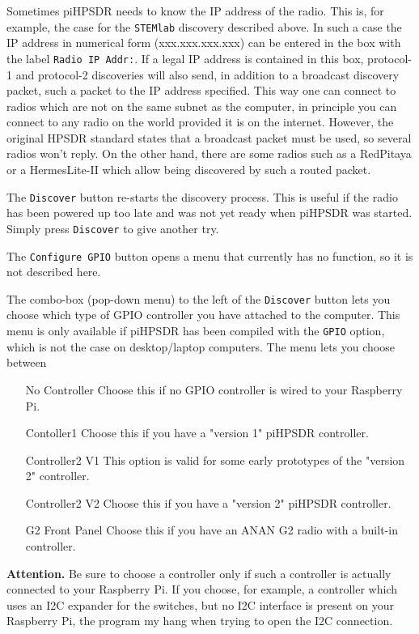 \documentclass[12pt]{book}
\begin{document}
Sometimes piHPSDR needs to know the IP address of the radio. This is, for example, the case for the \texttt{STEMlab} discovery
described above. In such a case the IP address in numerical form (xxx.xxx.xxx.xxx) can be entered in the box
with the label \texttt{Radio IP Addr:}. If a legal IP address is contained in this box, protocol-1 and protocol-2 discoveries
will also send, in addition to a broadcast discovery packet, such a packet to the IP address specified. This way one can
connect to radios which are not on the same subnet as the computer, in principle you can connect to any radio on the world
provided it is on the internet. However, the original HPSDR standard states that a broadcast packet must be used, so several
radios won't reply. On the other hand, there are some radios such as a RedPitaya or a HermesLite-II which allow being discovered
by such a routed packet. 

The \texttt{Discover} button re-starts the discovery process. This is useful if the radio has been powered up too late and
was not yet ready when piHPSDR was started. Simply press \texttt{Discover} to give another try.

The \texttt{Configure GPIO} button opens a menu that currently has no function, so it is not described here.

The combo-box (pop-down menu) to the left of the \texttt{Discover} button lets you choose which type of GPIO controller you
have attached to the computer. This menu is only available if piHPSDR has been compiled with the \texttt{GPIO} option, which
is not the case on desktop/laptop computers. The menu lets you choose between

\begin{itemize}[font=\texttt, left=80pt]
\item[No Controller]{Choose this if no GPIO controller is wired to your Raspberry Pi.}
\item[Contoller1]{Choose this if you have a "version 1" piHPSDR controller.}
\item[Controller2 V1]{This option is valid for some early prototypes of the "version 2" controller.}
\item[Controller2 V2]{Choose this if you have a "version 2" piHPSDR controller.}
\item[G2 Front Panel]{Choose this if you have an ANAN G2 radio with a built-in controller.}
\end{itemize}

\textbf{Attention.} Be sure to choose a controller only if such a controller is actually connected to your Raspberry Pi. If
you choose, for example, a controller which uses an I2C expander for the switches, but no I2C interface is present on
your Raspberry Pi, the program my hang when trying to open the I2C connection.
\end{document}
